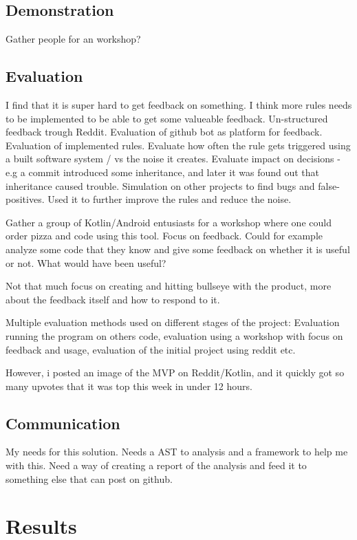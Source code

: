 \documentclass{article}
\begin{document}
\subsection{Demonstration}
Gather people for an workshop? 
 
\subsection{Evaluation}
I find that it is super hard to get feedback on something. I think more rules needs to be implemented to be able to get some valueable feedback. Un-structured feedback trough Reddit. Evaluation of github bot as platform for feedback. Evaluation of implemented rules. Evaluate how often the rule gets triggered using a built software system / vs the noise it creates. Evaluate impact on decisions - e.g a commit introduced some inheritance, and later it was found out that inheritance caused trouble. Simulation on other projects to find bugs and false-positives. Used it to further improve the rules and reduce the noise.

Gather a group of Kotlin/Android entusiasts for a workshop where one could order pizza and code using this tool. Focus on feedback. Could for example analyze some code that they know and give some feedback on whether it is useful or not. What would have been useful?

Not that much focus on creating and hitting bullseye with the product, more about the feedback itself and how to respond to it.

Multiple evaluation methods used on different stages of the project: Evaluation running the program on others code, evaluation using a workshop with focus on feedback and usage, evaluation of the initial project using reddit etc.

However, i posted an image of the MVP on Reddit/Kotlin, and it quickly got so many upvotes that it was top this week in under 12 hours. 

\subsection{Communication}


My needs for this solution. Needs a AST to analysis and a framework to help me with this. Need a way of creating a report of the analysis and feed it to something else that can post on github. 


\section{Results}
\end{document}
